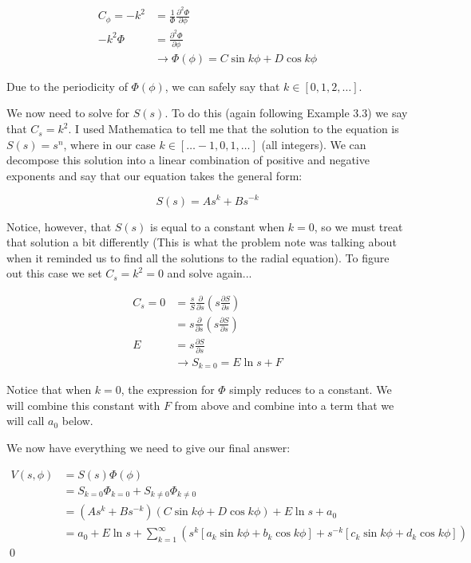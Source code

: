 \documentclass{homework}
\newcommand{\fracpd}[2]{
    \ensuremath{\frac{\partial #1}{\partial #2}}
  }
\begin{document}
\begin{homeworkProblem}[Problem 3.24]
{    \begin{align*}
     C_{\phi} =  -k^2 &=  \frac{1}{\Phi}  \fracpd{^2 \Phi}{\phi}  \\
      -k^2 \Phi &=  \fracpd{^2 \Phi}{\phi}\\
      &\rightarrow \Phi (\phi) = C\sin k\phi + D \cos k \phi
    \end{align*}

    Due to the periodicity of $\Phi(\phi)$, we can safely say that $k \in [0, 1, 2, \dots ]$.

    We now need to solve for $S(s)$. To do this (again following Example 3.3) we say that $C_s = k^2$. I used Mathematica to tell me that the solution to the equation is $S(s) = s^n$, where in our case  $k \in [\dots -1, 0, 1, \dots]$ (all integers).
    We can decompose this solution into a linear combination of positive and negative exponents and say that our equation takes the general form:

    $$S(s) = A s^k + Bs^{-k}$$

    Notice, however, that $S(s)$ is equal to a constant when $k=0$, so we must treat that solution a bit differently (This is what the problem note was talking about when it reminded us to find all the solutions to the radial equation). To figure out this case we set $C_s = k^2 = 0$ and solve again...

    \begin{align*}
      C_s = 0 &= \frac{s}{S} \fracpd{}{s} \left(s \fracpd{S}{s} \right) \\
      &= s \fracpd{}{s} \left(s \fracpd{S}{s} \right) \\
      E &= s \fracpd{S}{s} \\
      &\rightarrow S_{k=0} = E \ln s + F
    \end{align*}

    Notice that when $k=0$, the expression for $\Phi$ simply reduces to a constant. We will combine this constant with $F$ from above and combine into a term that we will call $a_0$ below.

    We now have everything we need to give our final answer:

    \begin{align*}
      V(s, \phi) &= S(s) \Phi(\phi) \\
        &= S_{k=0} \Phi_{k=0} + S_{k \ne 0} \Phi_{k \ne 0}\\
        &= \left( A s^k + Bs^{-k} \right) \left(C\sin k\phi + D \cos k \phi \right) + E \ln s + a_0\\
        &= a_0 + E \ln s + \sum_{k=1}^{\infty} \left( s^k [a_k \sin k \phi + b_k \cos k \phi]  + s^{-k} [c_k \sin k \phi + d_k \cos k \phi] \right)
    \end{align*}
    \qed
  }
\end{homeworkProblem}
\end{document}
